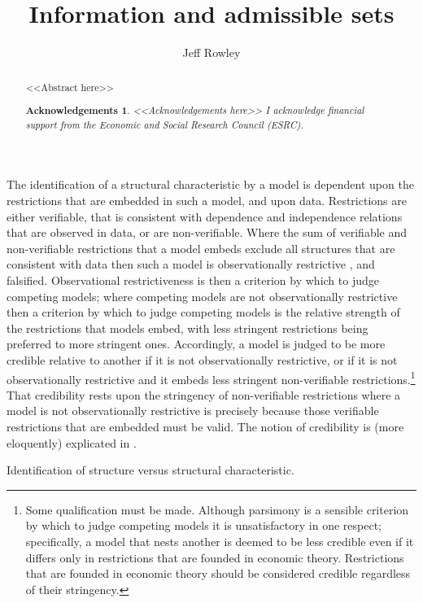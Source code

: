 \documentclass[10pt,a4paper,twoside]{article}
\title{Information and admissible sets}
\author{Jeff Rowley}
\newtheorem*{Acknowledgements}{Acknowledgements}
\numberwithin{equation}{subsection}
\newcommand{\ESRC}{I acknowledge financial support from the Economic and Social Research Council (ESRC).}
\begin{document}
\maketitle
\vspace{10mm}
\begin{abstract}
\noindent <<Abstract here>>
\begin{Acknowledgements}
<<Acknowledgements here>>
\ESRC
\end{Acknowledgements}
\end{abstract}
\vspace{5mm}
\noindent The identification of a structural characteristic by a model is dependent upon the restrictions that are embedded in such a model, and upon data. Restrictions are either verifiable, that is consistent with dependence and independence relations that are observed in data, or are non-verifiable. Where the sum of verifiable and non-verifiable restrictions that a model embeds exclude all structures that are consistent with data then such a model is observationally restrictive \citep{krE50}, and falsified. Observational restrictiveness is then a criterion by which to judge competing models; where competing models are not observationally restrictive then a criterion by which to judge competing models is the relative strength of the restrictions that models embed, with less stringent restrictions being preferred to more stringent ones. Accordingly, a model is judged to be more credible relative to another if it is not observationally restrictive, or if it is not observationally restrictive and it embeds less stringent non-verifiable restrictions.\footnote{Some qualification must be made. Although parsimony is a sensible criterion by which to judge competing models it is unsatisfactory in one respect; specifically, a model that nests another is deemed to be less credible even if it differs only in restrictions that are founded in economic theory. Restrictions that are founded in economic theory should be considered credible regardless of their stringency.} That credibility rests upon the stringency of non-verifiable restrictions where a model is not observationally restrictive is precisely because those verifiable restrictions that are embedded must be valid. The notion of credibility is (more eloquently) explicated in \cite{book.manski}. 

Identification of structure versus structural characteristic.
\end{document}
